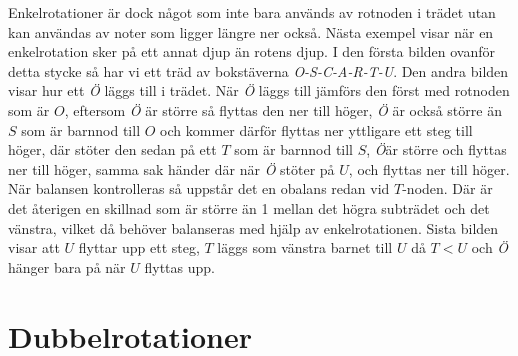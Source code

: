 \documentclass[a5paper,10pt,oneside]{article}
\begin{document}
Enkelrotationer är dock något som inte bara används av rotnoden i trädet utan kan användas av noter som ligger längre ner också. Nästa exempel visar när en enkelrotation sker på ett annat djup än rotens djup. I den första bilden ovanför detta stycke så har vi ett träd av bokstäverna \textit{O-S-C-A-R-T-U}. Den andra bilden visar hur ett \textit{Ö} läggs till i trädet. När \textit{Ö} läggs till jämförs den först med rotnoden som  är $O$, eftersom \textit{Ö} är större så flyttas den ner till höger, \textit{Ö} är också större än $S$ som är barnnod till $O$ och kommer därför flyttas ner yttligare ett steg till höger, där stöter den sedan på ett $T$ som är barnnod till $S$, \textit{Ö}är större och flyttas ner till höger, samma sak händer där när \textit{Ö} stöter på $U$, och flyttas ner till höger. När balansen kontrolleras så uppstår det en obalans redan vid $T$-noden. Där är det återigen en skillnad som är större än 1 mellan det högra subträdet och det vänstra, vilket då behöver balanseras med hjälp av enkelrotationen. Sista bilden visar att $U$ flyttar upp ett steg, $T$ läggs som vänstra barnet till $U$ då $T < U$ och \textit{Ö} hänger bara på när $U$ flyttas upp. 

\section*{Dubbelrotationer}
\end{document}
